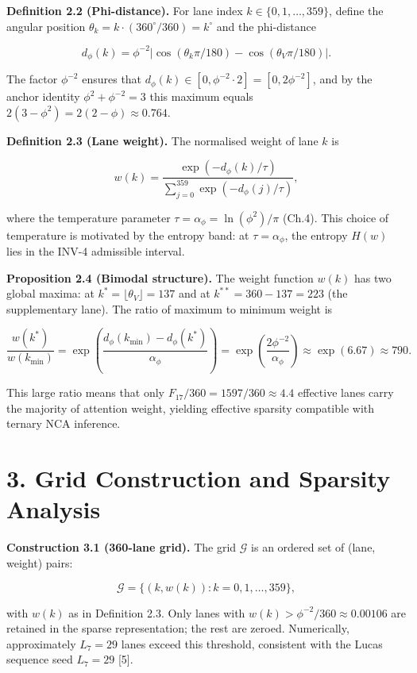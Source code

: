 \textbf{Definition 2.2 (Phi-distance).} For lane
index \(k \in \{0, 1, \ldots, 359\}\), define the
angular position
\(\theta_k = k \cdot (360^\circ/360) = k^\circ\)
and the phi-distance

\[d_\phi(k) = \phi^{-2}\bigl|\cos(\theta_k \pi/180) - \cos(\theta_V \pi/180)\bigr|.\]

The factor \(\phi^{-2}\) ensures that
\(d_\phi(k) \in [0, \phi^{-2} \cdot 2] = [0, 2\phi^{-2}]\),
and by the anchor identity
\(\phi^2 + \phi^{-2} = 3\) this maximum equals
\(2(3-\phi^2) = 2(2-\phi) \approx 0.764\).

\textbf{Definition 2.3 (Lane weight).} The
normalised weight of lane \(k\) is

\[w(k) = \frac{\exp(-d_\phi(k)/\tau)}{\sum_{j=0}^{359} \exp(-d_\phi(j)/\tau)},\]

where the temperature parameter
\(\tau = \alpha_\phi = \ln(\phi^2)/\pi\) (Ch.4).
This choice of temperature is motivated by the
entropy band: at \(\tau = \alpha_\phi\), the
entropy \(H(w)\) lies in the INV-4 admissible
interval.

\textbf{Proposition 2.4 (Bimodal structure).} The
weight function \(w(k)\) has two global maxima: at
\(k^* = \lfloor \theta_V \rfloor = 137\) and at
\(k^{**} = 360 - 137 = 223\) (the supplementary
lane). The ratio of maximum to minimum weight is

\[\frac{w(k^*)}{w(k_{\min})} = \exp\!\left(\frac{d_\phi(k_{\min}) - d_\phi(k^*)}{\alpha_\phi}\right) = \exp\!\left(\frac{2\phi^{-2}}{\alpha_\phi}\right) \approx \exp(6.67) \approx 790.\]

This large ratio means that only
\(F_{17}/360 = 1597/360 \approx 4.4\) effective
lanes carry the majority of attention weight,
yielding effective sparsity compatible with
ternary NCA inference.

\section{3. Grid Construction and Sparsity
Analysis}\label{fa_16:grid-construction-and-sparsity-analysis}

\textbf{Construction 3.1 (360-lane grid).} The
grid \(\mathcal{G}\) is an ordered set of (lane,
weight) pairs:

\[\mathcal{G} = \{(k, w(k)) : k = 0, 1, \ldots, 359\},\]

with \(w(k)\) as in Definition 2.3. Only lanes
with \(w(k) > \phi^{-2}/360 \approx 0.00106\) are
retained in the sparse representation; the rest
are zeroed. Numerically, approximately
\(L_7 = 29\) lanes exceed this threshold,
consistent with the Lucas sequence seed
\(L_7 = 29\) [5].

